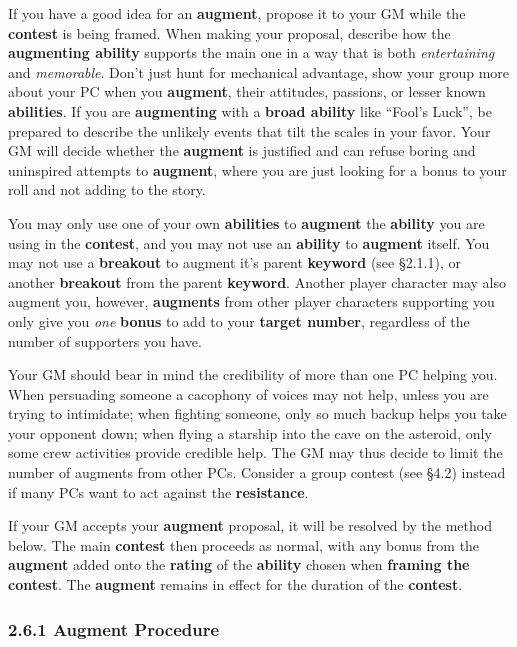 \documentclass[
  11pt,
]{article}
\begin{document}
If you have a good idea for an \textbf{augment}, propose it to your GM
while the \textbf{contest} is being framed. When making your proposal,
describe how the \textbf{augmenting ability} supports the main one in a
way that is both \emph{entertaining} and \emph{memorable}. Don't just
hunt for mechanical advantage, show your group more about your PC when
you \textbf{augment}, their attitudes, passions, or lesser known
\textbf{abilities}. If you are \textbf{augmenting} with a \textbf{broad
ability} like ``Fool's Luck'', be prepared to describe the unlikely
events that tilt the scales in your favor. Your GM will decide whether
the \textbf{augment} is justified and can refuse boring and uninspired
attempts to \textbf{augment}, where you are just looking for a bonus to
your roll and not adding to the story.

You may only use one of your own \textbf{abilities} to \textbf{augment}
the \textbf{ability} you are using in the \textbf{contest}, and you may
not use an \textbf{ability} to \textbf{augment} itself. You may not use
a \textbf{breakout} to augment it's parent \textbf{keyword} (see
§2.1.1), or another \textbf{breakout} from the parent \textbf{keyword}.
Another player character may also augment you, however,
\textbf{augments} from other player characters supporting you only give
you \emph{one} \textbf{bonus} to add to your \textbf{target number},
regardless of the number of supporters you have.

Your GM should bear in mind the credibility of more than one PC helping
you. When persuading someone a cacophony of voices may not help, unless
you are trying to intimidate; when fighting someone, only so much backup
helps you take your opponent down; when flying a starship into the cave
on the asteroid, only some crew activities provide credible help. The GM
may thus decide to limit the number of augments from other PCs. Consider
a group contest (see §4.2) instead if many PCs want to act against the
\textbf{resistance}.

If your GM accepts your \textbf{augment} proposal, it will be resolved
by the method below. The main \textbf{contest} then proceeds as normal,
with any bonus from the \textbf{augment} added onto the \textbf{rating}
of the \textbf{ability} chosen when \textbf{framing the contest}. The
\textbf{augment} remains in effect for the duration of the
\textbf{contest}.

\hypertarget{augment-procedure}{%
\subsubsection{2.6.1 Augment Procedure}\label{augment-procedure}}
\end{document}
